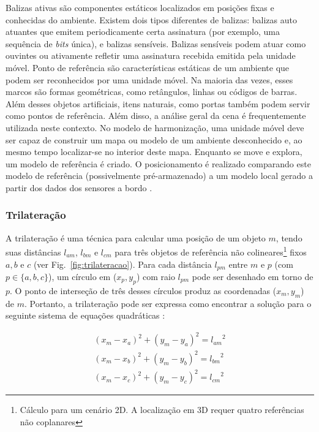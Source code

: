 Balizas ativas são componentes estáticos localizados em posições fixas e conhecidas do ambiente. Existem dois tipos diferentes de balizas: balizas auto atuantes que emitem periodicamente certa assinatura (por exemplo, uma sequência de \textit{bits} única), e balizas sensíveis. Balizas sensíveis podem atuar como ouvintes ou ativamente refletir uma assinatura recebida emitida pela unidade móvel. Ponto de referência são características estáticas de um ambiente que podem ser reconhecidos por uma unidade móvel. Na maioria das vezes, esses marcos são formas geométricas, como retângulos, linhas ou códigos de barras. Além desses objetos artificiais, itens naturais, como portas também podem servir como pontos de referência. Além disso, a análise geral da cena é frequentemente utilizada neste contexto. No modelo de harmonização, uma unidade móvel deve ser capaz de construir um mapa ou modelo de um ambiente desconhecido e, ao mesmo tempo localizar-se no interior deste mapa. Enquanto se move e explora, um modelo de referência é criado. O posicionamento é realizado comparando este modelo de referência (possivelmente pré-armazenado) a um modelo local gerado a partir dos dados dos sensores a bordo \cite{linde2006aspects}.

\subsubsection{Trilateração}\label{sec:trilat}
A trilateração é uma técnica para calcular uma posição de um objeto $m$, tendo suas distâncias $l_{am}$, $l_{bm}$ e $l_{cm}$ para três objetos de referência não colineares\footnote{ Cálculo para um cenário 2D. A localização em 3D requer quatro referências não coplanares} fixos $a, b$ e $c$ (ver Fig.~\ref{fig:trilateracao}). Para cada distância $l_{pm}$ entre $m$ e $p$ (com $p \in \{a, b, c\}$), um círculo em ($x_{p}, y_{p}$) com raio $l_{pm}$ pode ser desenhado em torno de $p$. O ponto de interseção de três desses círculos produz as coordenadas ($x_{m}, y_{m}$) de $m$. Portanto, a trilateração pode ser expressa como encontrar a solução para o seguinte sistema de equações quadráticas \cite{linde2006aspects}:

\begin{align*}
(x_{m}-x_{a})^{2} + (y_{m}-y_{a})^{2} = {l_{am}}^{2}\\
(x_{m}-x_{b})^{2} + (y_{m}-y_{b})^{2} = {l_{bm}}^{2}\\
(x_{m}-x_{c})^{2} + (y_{m}-y_{c})^{2} = {l_{cm}}^{2}
\end{align*}



